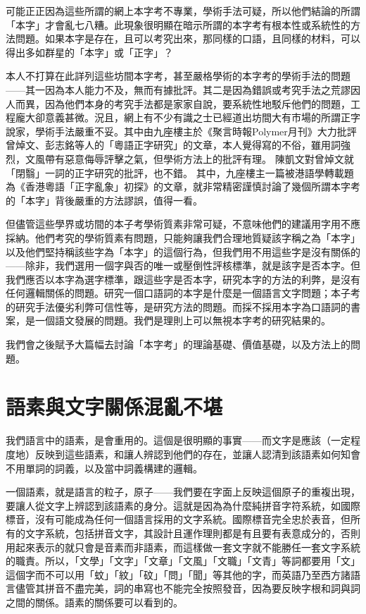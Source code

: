 \documentclass[a5paper, 10pt, openany]{book} %
\begin{document}
可能正正因為這些所謂的網上本字考不專業，學術手法可疑，所以他們結論的所謂「本字」才會亂七八糟。此現象很明顯在暗示所謂的本字考有根本性或系統性的方法問題。如果本字是存在，且可以考究出來，那同樣的口語，且同樣的材料，可以得出多如群星的「本字」或「正字」？

本人不打算在此詳列這些坊間本字考，甚至嚴格學術的本字考的學術手法的問題——其一因為本人能力不及，無而有據批評。其二是因為錯誤或考究手法之荒謬因人而異，因為他們本身的考究手法都是家家自說，要系統性地駁斥他們的問題，工程龐大卻意義甚微。況且，網上有不少有識之士已經道出坊間大有市場的所謂正字說家，學術手法嚴重不妥。其中由九座樓主於《聚言時報Polymer月刊》大力批評曾焯文、彭志銘等人的「粵語正字研究」的文章，本人覺得寫的不俗，雖用詞強烈，文風帶有惡意侮辱評擊之氣，但學術方法上的批評有理。 陳凱文對曾焯文就「閉翳」一詞的正字研究的批評，也不錯。  其中，九座樓主一篇被港語學轉載題為《香港粵語「正字亂象」初探》的文章，就非常精密謹慎討論了幾個所謂本字考的「本字」背後嚴重的方法謬誤，值得一看。 

但儘管這些學界或坊間的本子考學術質素非常可疑，不意味他們的建議用字用不應採納。他們考究的學術質素有問題，只能夠讓我們合理地質疑該字稱之為「本字」以及他們堅持稱該些字為「本字」的這個行為，但我們用不用這些字是沒有關係的——除非，我們選用一個字與否的唯一或壓倒性評核標準，就是該字是否本字。但我們應否以本字為選字標準，跟這些字是否本字，研究本字的方法的利弊，是沒有任何邏輯關係的問題。研究一個口語詞的本字是什麼是一個語言文字問題；本子考的研究手法優劣利弊可信性等，是研究方法的問題。而採不採用本字為口語詞的書案，是一個語文發展的問題。我們是理則上可以無視本字考的研究結果的。

我們會之後賦予大篇幅去討論「本字考」的理論基礎、價值基礎，以及方法上的問題。

\section{語素與文字關係混亂不堪}

我們語言中的語素，是會重用的。這個是很明顯的事實——而文字是應該（一定程度地）反映到這些語素，和讓人辨認到他們的存在，並讓人認清到該語素如何知會不用單詞的詞義，以及當中詞義構建的邏輯。

一個語素，就是語言的粒子，原子——我們要在字面上反映這個原子的重複出現，要讓人從文字上辨認到該語素的身分。這就是因為為什麼純拼音字符系統，如國際標音，沒有可能成為任何一個語言採用的文字系統。國際標音完全忠於表音，但所有的文字系統，包括拼音文字，其設計且運作理則都是有且要有表意成分的，否則用起來表示的就只會是音素而非語素，而這樣做一套文字就不能勝任一套文字系統的職責。所以，「文學」「文字」「文章」「文風」「文職」「文青」等詞都要用「文」這個字而不可以用「蚊」「紋」「砇」「問」「聞」等其他的字，而英語乃至西方諸語言儘管其拼音不盡完美，詞的串寫也不能完全按照發音，因為要反映字根和詞與詞之間的關係。語素的關係要可以看到的。
\end{document}
